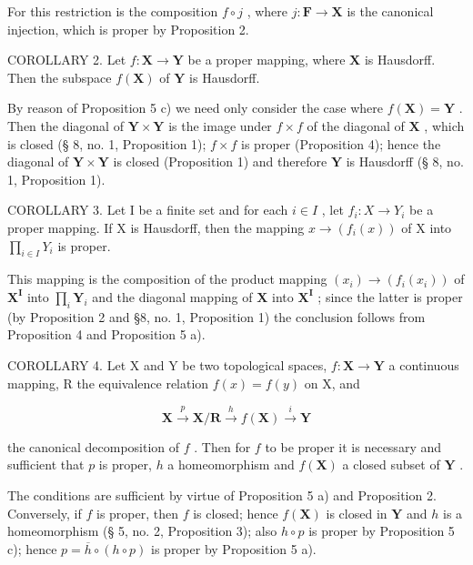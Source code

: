For this restriction is the composition \(f \circ j\) , where \(j: \mathbf{F} \to \mathbf{X}\) is the canonical injection, which is proper by Proposition 2.

COROLLARY 2. Let \(f: \mathbf{X} \to \mathbf{Y}\) be a proper mapping, where \(\mathbf{X}\) is Hausdorff. Then the subspace \(f(\mathbf{X})\) of \(\mathbf{Y}\) is Hausdorff.

By reason of Proposition 5 c) we need only consider the case where \(f(\mathbf{X}) = \mathbf{Y}\) . Then the diagonal of \(\mathbf{Y} \times \mathbf{Y}\) is the image under \(f \times f\) of the diagonal of \(\mathbf{X}\) , which is closed (§ 8, no. 1, Proposition 1); \(f \times f\) is proper (Proposition 4); hence the diagonal of \(\mathbf{Y} \times \mathbf{Y}\) is closed (Proposition 1) and therefore \(\mathbf{Y}\) is Hausdorff (§ 8, no. 1, Proposition 1).

COROLLARY 3. Let I be a finite set and for each \(i \in I\) , let \(f_i: X \to Y_i\) be a proper mapping. If X is Hausdorff, then the mapping \(x \to (f_i(x))\) of X into \(\prod_{i \in I} Y_i\) is proper.

This mapping is the composition of the product mapping \((x_{i})\to (f_{i}(x_{i}))\) of \(\mathbf{X}^{\mathbf{I}}\) into \(\prod_{i}\mathbf{Y}_{i}\) and the diagonal mapping of \(\mathbf{X}\) into \(\mathbf{X}^{\mathbf{I}}\) ; since the latter is proper (by Proposition 2 and §8, no. 1, Proposition 1) the conclusion follows from Proposition 4 and Proposition 5 a).

COROLLARY 4. Let X and Y be two topological spaces, \(f: \mathbf{X} \to \mathbf{Y}\) a continuous mapping, R the equivalence relation \(f(x) = f(y)\) on X, and

\[
\mathbf {X} \xrightarrow {p} \mathbf {X} / \mathbf {R} \xrightarrow {h} f (\mathbf {X}) \xrightarrow {i} \mathbf {Y}
\]

the canonical decomposition of \(f\) . Then for \(f\) to be proper it is necessary and sufficient that \(p\) is proper, \(h\) a homeomorphism and \(f(\mathbf{X})\) a closed subset of \(\mathbf{Y}\) .

The conditions are sufficient by virtue of Proposition 5 a) and Proposition 2. Conversely, if \(f\) is proper, then \(f\) is closed; hence \(f(\mathbf{X})\) is closed in \(\mathbf{Y}\) and \(h\) is a homeomorphism (§ 5, no. 2, Proposition 3); also \(h \circ p\) is proper by Proposition 5 c); hence \(p = \overline{h} \circ (h \circ p)\) is proper by Proposition 5 a).

